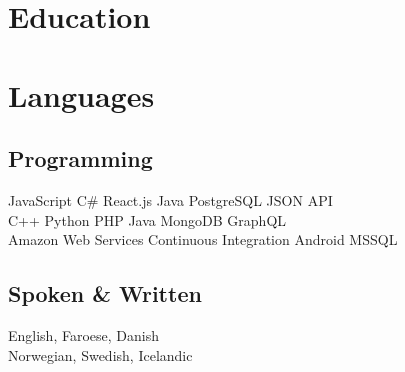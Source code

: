 \documentclass[]{deedy-resume-openfont}
\begin{document}
\section{Education}
\sectionsep

\section{Languages}
\begin{minipage}[t]{.6\textwidth}
\subsection{Programming}
JavaScript \textbullet{} C\# \textbullet{} React.js \textbullet{} Java \textbullet{} PostgreSQL \textbullet{} JSON API \\
C++ \textbullet{} Python \textbullet{} PHP \textbullet{} Java \textbullet{} MongoDB \textbullet{} GraphQL \\
Amazon Web Services \textbullet{} Continuous Integration \textbullet{} Android \textbullet{} MSSQL
\sectionsep
\end{minipage}
\hfill
\begin{minipage}[t]{.35\textwidth}
\subsection{Spoken \& Written}
 English, Faroese, Danish\\
 Norwegian, Swedish, Icelandic\\
\end{minipage}
\end{document}
